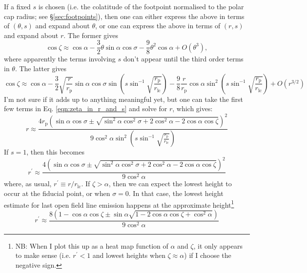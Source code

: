 \documentclass{book}
\newcommand{\rL}{r_\text{lc}} %
\newcommand{\rp}{r_\text{p}} %
\begin{document}
If a fixed $s$ is chosen (i.e. the colatitude of the footpoint normalised to the polar cap radius; see \S\ref{sec:footpoints}), then one can either express the above in terms of $(\theta,s)$ and expand about $\theta$, or one can express the above in terms of $(r,s)$ and expand about $r$.
The former gives
\begin{equation}
    \cos\zeta \approx \cos\alpha - \frac32\theta\sin\alpha\cos\sigma - \frac98\theta^2\cos\alpha + O(\theta^3),
\end{equation}
where apparently the terms involving $s$ don't appear until the third order terms in $\theta$.
The latter gives
\begin{equation}
    \cos\zeta \approx
        \cos\alpha -
        \frac32\sqrt{\frac{r}{\rp}}\sin\alpha\cos\sigma\sin\left(s\sin^{-1}\sqrt{\frac{\rp}{\rL}}\right) -
        \frac98\frac{r}{\rp}\cos\alpha\sin^2\left(s\sin^{-1}\sqrt{\frac{\rp}{\rL}}\right) +
        O(r^{3/2})
    \label{eqn:zeta_in_r_and_s}
\end{equation}
I'm not sure if it adds up to anything meaningful yet, but one can take the first few terms in Eq. \eqref{eqn:zeta_in_r_and_s} and solve for $r$, which gives:
\begin{equation}
    r \approx \frac{4\rp\left(\sin\alpha\cos\sigma \pm \sqrt{\sin^2\alpha\cos^2\sigma + 2\cos^2\alpha - 2\cos\alpha\cos\zeta}\right)^2}{
        9\cos^2\alpha\sin^2\left(s\sin^{-1}\sqrt{\frac{\rp}{\rL}}\right)}
\end{equation}
If $s=1$, then this becomes
\begin{equation}
    r^\prime \approx \frac{4\left(\sin\alpha\cos\sigma \pm \sqrt{\sin^2\alpha\cos^2\sigma + 2\cos^2\alpha - 2\cos\alpha\cos\zeta}\right)^2}{
        9\cos^2\alpha}
\end{equation}
where, as usual, $r^\prime \equiv r/\rL$.
If $\zeta > \alpha$, then we can expect the lowest height to occur at the fiducial point, or when $\sigma = 0$. In that case, the lowest height estimate for last open field line emission happens at the approximate height\footnote{NB: When I plot this up as a heat map function of $\alpha$ and $\zeta$, it only appears to make sense (i.e. $r^\prime < 1$ and lowest heights when $\zeta \approx \alpha$) if I choose the negative sign.}
\begin{equation}
    r^\prime \approx \frac{8\left(1 - \cos\alpha\cos\zeta \pm \sin\alpha\sqrt{1 - 2\cos\alpha\cos\zeta + \cos^2\alpha}\right)}{
        9\cos^2\alpha}
\end{equation}
\end{document}
